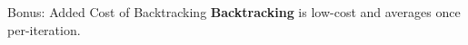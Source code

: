 \documentclass[notheorems]{beamer}
\begin{document}
    \begin{frame}{Bonus: Added Cost of Backtracking}
        \textbf{Backtracking} is low-cost and averages once per-iteration.
        \begin{figure}
        \end{figure}

    \end{frame}
\end{document}
